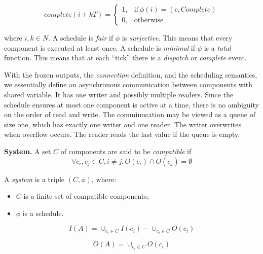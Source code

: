\begin{equation}
\label{eqn:complete}
    complete(i+kT) =
    \begin{cases}
      1, & \text{if}\ \phi(i) = (c, Complete) \\
      0, & \text{otherwise}
    \end{cases}
\end{equation}

where $i,k\in N$.
A schedule is \emph{fair} if $\phi$ is \emph{surjective}. This means that every component is executed at least once.
A schedule is \emph{minimal} if $\phi$ is a \emph{total} function. This means that at each ``tick'' there is a \emph{dispatch} or \emph{complete} event. 

With the frozen outputs, the \emph{connection} definition, and the scheduling semantics, we essentially define an asynchronous communication between components with shared variable. It has one writer and possibly multiple readers. Since the schedule ensures at most one component is active at a time, there is no ambiguity on the order of read and write. The comminucation may be viewed as a queue of size one, which has exactly one writer and one reader. The writer overwrites when overflow occurs. The reader reads the last value if the queue is empty.

{\bf System.}
A set $C$ of components are said to be \emph{compatible} if 
\begin{equation*}
\forall c_i,c_j \in C, i\neq j, O(c_i) \cap O(c_j) = \emptyset 
\end{equation*}

A \emph{system} is a triple $(C, \phi)$, where:
\begin{itemize}
    	\item $C$ is a finite set of compatible components;
    	\item $\phi$ is a schedule.
\end{itemize}

\begin{equation*}
I(A) = \cup_{c_i \in C}I(c_i) -  \cup_{c_i \in C}O(c_i)
\end{equation*}

\begin{equation*}
O(A) = \cup_{c_i \in C}O(c_i)
\end{equation*}

